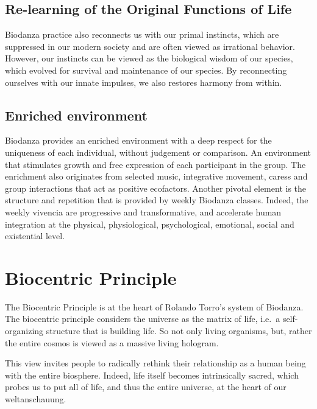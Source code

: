 \documentclass[
  11pt,
]{book}
\begin{document}
\hypertarget{re-learning-of-the-original-functions-of-life}{%
\subsection{Re-learning of the Original Functions of Life}\label{re-learning-of-the-original-functions-of-life}}

Biodanza practice also reconnects us with our primal instincts, which are suppressed in our modern society and are often viewed as irrational behavior.
However, our instincts can be viewed as the biological wisdom of our species, which evolved for survival and maintenance of our species. By reconnecting ourselves with our innate impulses, we also restores harmony from within.

\hypertarget{enriched-environment}{%
\subsection{Enriched environment}\label{enriched-environment}}

Biodanza provides an enriched environment with a deep respect for the uniqueness of each individual, without judgement or comparison. An environment that stimulates growth and free expression of each participant in the group. The enrichment also originates from selected music, integrative movement, caress and group interactions that act as positive ecofactors. Another pivotal element is the structure and repetition that is provided by weekly Biodanza classes. Indeed, the weekly vivencia are progressive and transformative, and accelerate human integration at the physical, physiological, psychological, emotional, social and existential level.

\hypertarget{sectionBiocentricPrinciple}{%
\section{Biocentric Principle}\label{sectionBiocentricPrinciple}}

The Biocentric Principle is at the heart of Rolando Torro's system of Biodanza. The biocentric principle considers the universe as the matrix of life, i.e.~a self-organizing structure that is building life. So not only living organisms, but, rather the entire cosmos is viewed as a massive living hologram.

This view invites people to radically rethink their relationship as a human being with the entire biosphere. Indeed, life itself becomes intrinsically sacred, which probes us to put all of life, and thus the entire universe, at the heart of our weltanschauung.
\end{document}
